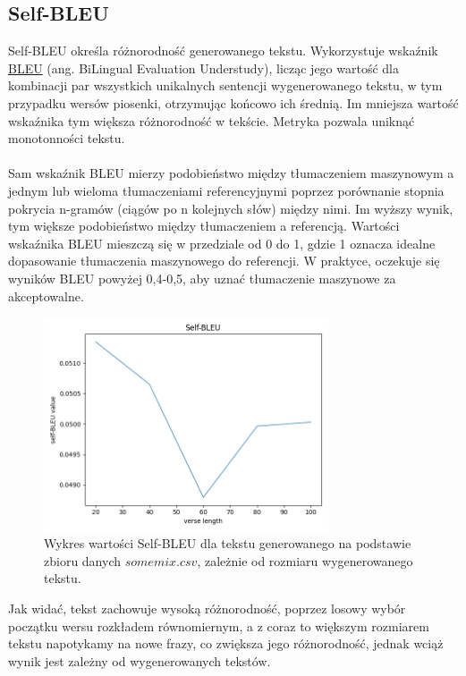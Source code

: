 \documentclass{article}
\begin{document}
\subsection{Self-BLEU}
Self-BLEU określa różnorodność generowanego tekstu. Wykorzystuje wskaźnik \href{https://pl.wikipedia.org/wiki/BLEU}{BLEU} (ang. BiLingual Evaluation Understudy), licząc jego wartość dla kombinacji par wszystkich unikalnych sentencji wygenerowanego tekstu, w tym przypadku wersów piosenki, otrzymując końcowo ich średnią. Im mniejsza wartość wskaźnika tym większa różnorodność w tekście. Metryka pozwala uniknąć monotonności tekstu. \\\\
Sam wskaźnik BLEU mierzy podobieństwo między tłumaczeniem maszynowym a jednym lub wieloma tłumaczeniami referencyjnymi poprzez porównanie stopnia pokrycia n-gramów (ciągów po n kolejnych słów) między nimi. Im wyższy wynik, tym większe podobieństwo między tłumaczeniem a referencją. Wartości wskaźnika BLEU mieszczą się w przedziale od 0 do 1, gdzie 1 oznacza idealne dopasowanie tłumaczenia maszynowego do referencji. W praktyce, oczekuje się wyników BLEU powyżej 0,4-0,5, aby uznać tłumaczenie maszynowe za akceptowalne.\\
\begin{figure}[h]
    \centering
    \includegraphics[width=0.75\textwidth]{self-bleu}
    \caption{Wykres wartości Self-BLEU dla tekstu generowanego na podstawie zbioru danych $somemix.csv$, zależnie od rozmiaru wygenerowanego tekstu.}
    \label{fig:mesh1}
\end{figure}
\FloatBarrier
Jak widać, tekst zachowuje wysoką różnorodność, poprzez losowy wybór początku wersu rozkładem równomiernym, a z coraz to większym rozmiarem tekstu napotykamy na nowe frazy, co zwiększa jego różnorodność, jednak wciąż wynik jest zależny od wygenerowanych tekstów.
\FloatBarrier
\end{document}

